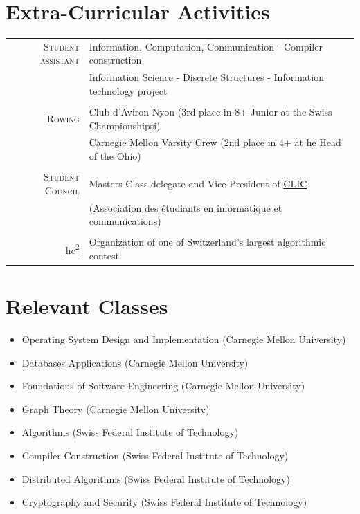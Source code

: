 \documentclass[a4paper,11pt]{article} %
\begin{document}
\section{Extra-Curricular Activities}
\begin{tabular}{rl}
\textsc{\large{Student assistant}} &
Information, Computation, Communication -
Compiler construction\\
& Information Science - Discrete Structures - 
Information technology project \\
\multicolumn{2}{c}{} \\

\textsc{\large{Rowing}} &
Club d'Aviron Nyon (3rd place in 8+ Junior at the Swiss Championshipsi)\\
& Carnegie Mellon Varsity Crew (2nd place in 4+ at he Head of the Ohio)\\
\multicolumn{2}{c}{} \\

\textsc{\large{Student Council}} &
Masters Class delegate and Vice-President of
\href{http://clic.epfl.ch/}{CLIC}\\
& (Association des étudiants en informatique et communications)\\
\multicolumn{2}{c}{} \\

\large{\href{http://hc2.ch/}{hc\textsuperscript{2}}} & Organization of one of
Switzerland's largest algorithmic contest.\\
\end{tabular}



\section{Relevant Classes}
\begin{center}
\begin{itemize}
\item Operating System Design and Implementation (Carnegie Mellon University) 
\item Databases Applications (Carnegie Mellon University)
\item Foundations of Software Engineering (Carnegie Mellon University)
\item Graph Theory (Carnegie Mellon University)
\item Algorithms (Swiss Federal Institute of Technology)
\item Compiler Construction (Swiss Federal Institute of Technology)
\item Distributed Algorithms (Swiss Federal Institute of Technology)
\item Cryptography and Security (Swiss Federal Institute of Technology)
\end{itemize}
\end{center}
\end{document}
